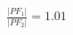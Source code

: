 \documentclass[preview]{standalone}
\begin{document}
\begin{align*}
\frac{|PF_1|}{|PF_2|} = 1.01
\end{align*}
\end{document}

